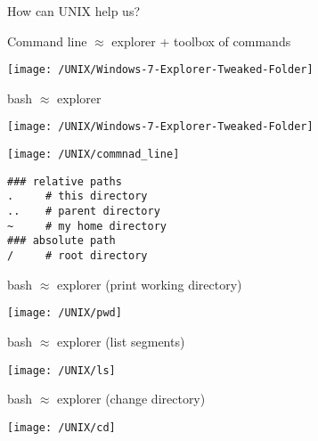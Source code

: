 \documentclass[xcolor=dvipsnames]{beamer}
\begin{document}
\begin{frame}
	\Huge
	\begin{center}
		How can UNIX help us?	
	\end{center}
\end{frame}

\begin{frame}
	Command line $\approx$ explorer + toolbox of commands
	\begin{center}
		\texttt{[image: /UNIX/Windows-7-Explorer-Tweaked-Folder]}
	\end{center}
\end{frame}

\begin{frame}
	bash $\approx$ explorer
	\begin{center}
		\texttt{[image: /UNIX/Windows-7-Explorer-Tweaked-Folder]}
	\end{center}
\end{frame}

\begin{frame}
	\begin{center}
		\texttt{[image: /UNIX/commnad\_line]}
	\end{center}
\end{frame}

\begin{frame}[fragile]
\begin{verbatim}
### relative paths
.     # this directory
..    # parent directory
~     # my home directory
### absolute path
/     # root directory
\end{verbatim}
\end{frame}

\begin{frame}
	bash $\approx$ explorer (print working directory)
	\begin{center}
		\texttt{[image: /UNIX/pwd]}
	\end{center}
\end{frame}

\begin{frame}
	bash $\approx$ explorer (list segments)
	\begin{center}
		\texttt{[image: /UNIX/ls]}
	\end{center}
\end{frame}

\begin{frame}
	bash $\approx$ explorer (change directory)
	\begin{center}
		\texttt{[image: /UNIX/cd]}
	\end{center}
\end{frame}
		
\end{document}
